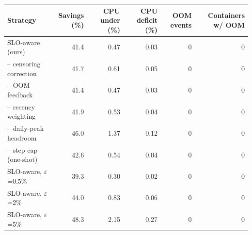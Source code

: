 \begin{tabular}{lrrrrr}\toprule
Strategy & Savings (\%) & CPU under (\%) & CPU deficit (\%) & OOM events & Containers w/ OOM \\\midrule
SLO-aware (ours) & 41.4 & 0.47 & 0.03 & 0 & 0 \\
-- censoring correction & 41.7 & 0.61 & 0.05 & 0 & 0 \\
-- OOM feedback & 41.4 & 0.47 & 0.03 & 0 & 0 \\
-- recency weighting & 41.9 & 0.53 & 0.04 & 0 & 0 \\
-- daily-peak headroom & 46.0 & 1.37 & 0.12 & 0 & 0 \\
-- step cap (one-shot) & 42.6 & 0.54 & 0.04 & 0 & 0 \\
SLO-aware, $\varepsilon$=0.5\% & 39.3 & 0.30 & 0.02 & 0 & 0 \\
SLO-aware, $\varepsilon$=2\% & 44.0 & 0.83 & 0.06 & 0 & 0 \\
SLO-aware, $\varepsilon$=5\% & 48.3 & 2.15 & 0.27 & 0 & 0 \\
\bottomrule\end{tabular}
